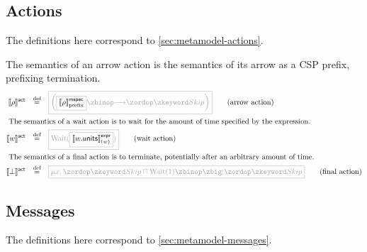 \subsection{Actions}\label{ssec:semantics-tockcsp-actions}

The definitions here correspond to \cref{sec:metamodel-actions}.

\begin{definition}[\msequenceaction]

\newcommand{\wait}[1]{\text{Wait}(#1)}
  
The semantics of an arrow action is the semantics of its arrow as a CSP prefix,
prefixing termination.
%
\begin{align*}
  \actsema{\anarrow}
  \quad\defeq\quad
  &
    \tlang{
    \left(
    \olang{\pmspecsema{\anarrow}}
    \then
    \Skip
    \right)
    }
    \tag{arrow action}
  \\
  \intertext{
  The semantics of a wait action is to wait for the amount of time specified by the expression.}
  \actsema{\await}
  \quad\defeq\quad
  &
    \tlang{
    \wait{\olang{\exprsema{\field{\await}{units}}{\await}}}
    }
    \tag{wait action}
  \\
  \intertext{
  The semantics of a final action is to terminate, potentially after an arbitrary amount of time.}
  \actsema{\bot}
  \quad\defeq\quad
  &
    \tlang{
    \mu x \ldotp
    \Skip
    \sqcap
    \wait{1} \circseq \Skip
    }
    \tag{final action}
\end{align*}

\end{definition}

\subsection{Messages}\label{ssec:semantics-tockcsp-messages}

The definitions here correspond to \cref{sec:metamodel-messages}.

